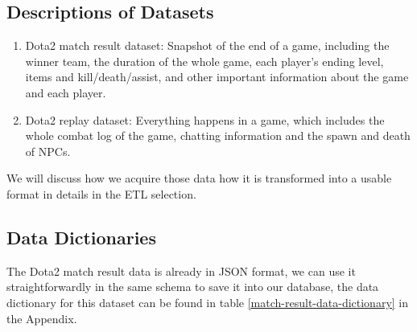 \documentclass{article}
\begin{document}
\subsection{Descriptions of Datasets}

\begin{enumerate}
\item Dota2 match result dataset: Snapshot of the end of a game, including the winner team, the duration of the whole game, each player's ending level, items and kill/death/assist, and other important information about the game and each player.
\item Dota2 replay dataset: Everything happens in a game, which includes the whole combat log of the game, chatting information and the spawn and death of NPCs.
\end{enumerate}

We will discuss how we acquire those data how it is transformed into a usable format in details in the ETL selection.

\subsection{Data Dictionaries}

The Dota2 match result data is already in JSON format, we can use it straightforwardly in the same schema to save it into our database, the data dictionary for this dataset can be found in table \ref{match-result-data-dictionary} in the Appendix.
\end{document}
